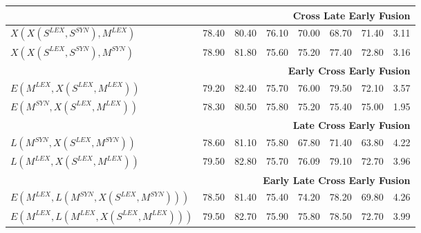 \begin{table}[h!]
\begin{tabular}{@{}lccc|cccc@{}}
 \midrule
       &            \multicolumn{7}{r}{\textbf{Cross Late Early Fusion}}       \\ \midrule
	   
 


       $X(X(S^{LEX}, S^{SYN}), M^{LEX})$		& 78.40 & 80.40 & 76.10 &	70.00	&68.70  & 71.40& 3.11 \\	   
       $X(X(S^{LEX}, S^{SYN}), M^{SYN})$		& 78.90 & 81.80 & 75.60 &	75.20	& 77.40 & 72.80 & 3.16 \\	   
       	  \midrule
       &            \multicolumn{7}{r}{\textbf{Early Cross Early Fusion}}       \\ \midrule	         
       
       $E(M^{LEX}, X(S^{LEX}, M^{LEX}))$		& 79.20 & 82.40 & 75.70 &	76.00	& 79.50  & 72.10 & 3.57 \\	   
	   $E(M^{SYN}, X(S^{LEX}, M^{LEX}))$		& 78.30 & 80.50 & 75.80 &	75.20	&75.40  & 75.00 & 1.95 \\	   
       \midrule
       &            \multicolumn{7}{r}{\textbf{Late Cross Early Fusion}}       \\ \midrule	  
	   $L(M^{SYN}, X(S^{LEX}, M^{SYN}))$		& 78.60 & 81.10 & 75.80 &	67.80	& 71.40&63.80 & 4.22 \\	   
	   $L(M^{LEX}, X(S^{LEX}, M^{LEX}))$		& 79.50 & 82.80 & 75.70 &	76.09	&79.10 &72.70 & 3.96 \\	   
       \midrule
       &            \multicolumn{7}{r}{\textbf{Early Late Cross Early Fusion}}       \\ \midrule	  
	   $E(M^{LEX}, L(M^{SYN}, X(S^{LEX}, M^{SYN})))$		& 78.50 & 81.40 & 75.40 &	74.20	& 78.20 & 69.80& 4.26 \\	   
	   $E(M^{LEX}, L(M^{LEX}, X(S^{LEX}, M^{LEX})))$		& 79.50 & 82.70 & 75.90 &	75.80	& 78.50&72.70 & 3.99 \\
	   
	   
		   
       \bottomrule
       
       
\end{tabular}


\end{table}